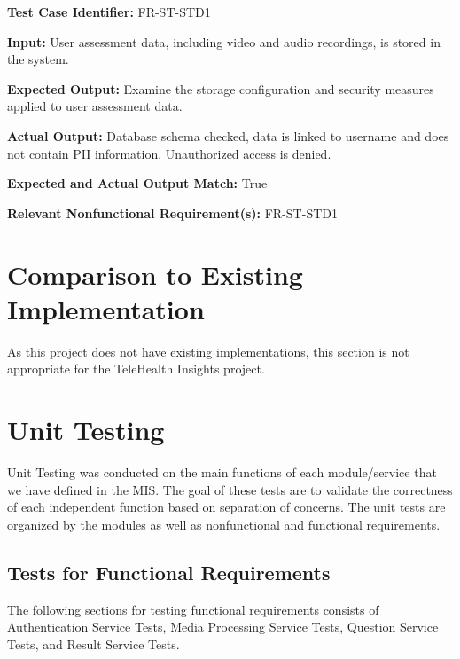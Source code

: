\documentclass[12pt, titlepage]{article}
\begin{document}
\begin{mdframed}[linewidth=0.5mm] \par
  \textbf{Test Case Identifier:} FR-ST-STD1 \par
  \textbf{Input:} User assessment data, including video and audio recordings, is
  stored in the system. \par
  \textbf{Expected Output:} Examine the storage configuration and security measures
  applied to user assessment data. \par
  \textbf{Actual Output:} Database schema checked, data is linked to username and does not contain PII information. 
  Unauthorized access is denied. \par
  \textbf{Expected and Actual Output Match:} True \par
  \textbf{Relevant Nonfunctional Requirement(s):} FR-ST-STD1
\end{mdframed}
	
\newpage{}

\section{Comparison to Existing Implementation}	

\hspace{2em}As this project does not have existing implementations, this section is not appropriate for the TeleHealth Insights project.

\section{Unit Testing}

\hspace{2em}Unit Testing was conducted on the main functions of each module/service that we have defined in the MIS. 
The goal of these tests are to validate the correctness of each independent function based on separation of concerns. 
The unit tests are organized by the modules as well as nonfunctional and functional requirements. 

\subsection{Tests for Functional Requirements}
\hspace{2em} The following sections for testing functional requirements consists of Authentication Service Tests, Media Processing Service Tests,
Question Service Tests, and Result Service Tests.
\end{document}
